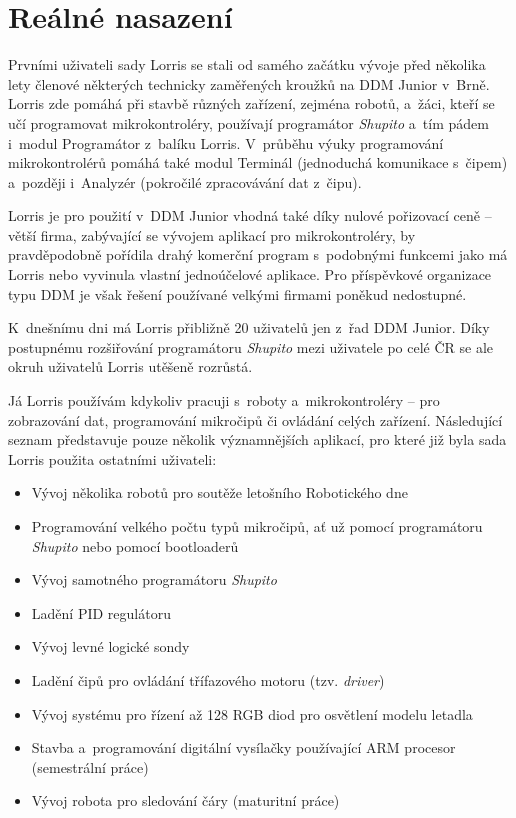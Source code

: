 \documentclass[12pt, a4paper, oneside]{article}
\newcommand{\It}{\textit}  %
\begin{document}
\newpage
\section{Reálné nasazení}
\label{usage}
Prvními uživateli sady Lorris se stali od samého začátku vývoje před několika lety členové některých technicky zaměřených kroužků na DDM Junior\cite{junior} v~Brně. Lorris zde pomáhá při stavbě různých zařízení, zejména robotů, a~žáci, kteří se učí programovat mikrokontroléry, používají programátor \It{Shupito} a~tím pádem i~modul Programátor z~balíku Lorris. V~průběhu výuky programování mikrokontrolérů pomáhá také modul Terminál (jednoduchá komunikace s~čipem) a~později i~Analyzér (pokročilé zpracovávání dat z~čipu).

Lorris je pro použití v~DDM Junior vhodná také díky nulové pořizovací ceně -- větší firma, zabývající se vývojem aplikací pro mikrokontroléry, by pravděpodobně pořídila drahý komerční program s~podobnými funkcemi jako má Lorris nebo vyvinula vlastní jednoúčelové aplikace. Pro příspěvkové organizace typu DDM je však řešení používané velkými firmami poněkud nedostupné.

K~dnešnímu dni má Lorris přibližně 20 uživatelů jen z~řad DDM Junior. Díky postupnému rozšiřování programátoru \It{Shupito} mezi uživatele po celé ČR se ale okruh uživatelů Lorris utěšeně rozrůstá.

\vspace{10mm}

\noindent Já Lorris používám kdykoliv pracuji s~roboty a~mikrokontroléry -- pro zobrazování dat, programování mikročipů či ovládání celých zařízení. Následující seznam představuje pouze několik významnějších aplikací, pro které již byla sada Lorris použita ostatními uživateli:
\begin{itemize}
    \item Vývoj několika robotů pro soutěže letošního Robotického dne\cite{rob_den_new}
    \item Programování velkého počtu typů mikročipů, ať už pomocí programátoru \It{Shupito} nebo pomocí bootloaderů
    \item Vývoj samotného programátoru \It{Shupito}
    \item Ladění PID regulátoru
    \item Vývoj levné logické sondy
    \item Ladění čipů pro ovládání třífazového motoru (tzv. \It{driver})
    \item Vývoj systému pro řízení až 128 RGB diod pro osvětlení modelu letadla
    \item Stavba a~programování digitální vysílačky používající ARM procesor (semestrální práce)
    \item Vývoj robota pro sledování čáry (maturitní práce)
\end{itemize}
\end{document}
